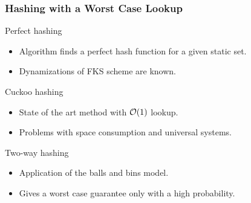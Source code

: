 \begin{frame}
	\frametitle{Hashing with a Worst Case Lookup}
	
	\begin{block}{Perfect hashing}
		\begin{itemize}
			\item Algorithm finds a perfect hash function for a given static set.
			\item Dynamizations of FKS scheme are known.
		\end{itemize}
	\end{block}
	
	\begin{block}{Cuckoo hashing}
		\begin{itemize}
			\item State of the art method with $\mathcal{O}(1)$ lookup.
			\item Problems with space consumption and universal systems.
		\end{itemize}
	\end{block}
	
	\begin{block}{Two-way hashing}
		\begin{itemize}
			\item Application of the balls and bins model.
			\item Gives a worst case guarantee only with a high probability.
		\end{itemize}
	\end{block}
\end{frame}

